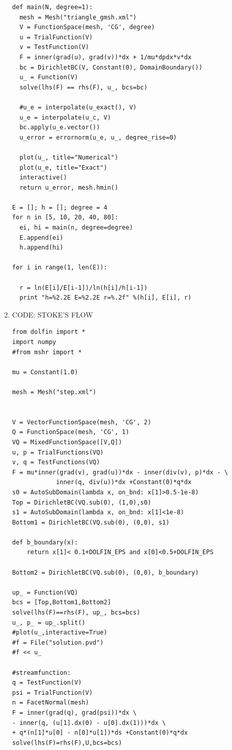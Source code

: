 \documentclass{article}
\begin{document}
\begin{enumerate}
\begin{verbatim}
def main(N, degree=1):
  mesh = Mesh("triangle_gmsh.xml")
  V = FunctionSpace(mesh, 'CG', degree)
  u = TrialFunction(V)
  v = TestFunction(V)
  F = inner(grad(u), grad(v))*dx + 1/mu*dpdx*v*dx
  bc = DirichletBC(V, Constant(0), DomainBoundary())
  u_ = Function(V)
  solve(lhs(F) == rhs(F), u_, bcs=bc)

  #u_e = interpolate(u_exact(), V)
  u_e = interpolate(u_c, V)
  bc.apply(u_e.vector())
  u_error = errornorm(u_e, u_, degree_rise=0)

  plot(u_, title="Numerical")
  plot(u_e, title="Exact")
  interactive()
  return u_error, mesh.hmin()

E = []; h = []; degree = 4
for n in [5, 10, 20, 40, 80]:
  ei, hi = main(n, degree=degree)
  E.append(ei)
  h.append(hi)

for i in range(1, len(E)):

  r = ln(E[i]/E[i-1])/ln(h[i]/h[i-1])
  print "h=%2.2E E=%2.2E r=%.2f" %(h[i], E[i], r)
\end{verbatim}

\newpage


\item{CODE: STOKE'S FLOW}
\begin{verbatim}
from dolfin import *
import numpy
#from mshr import *

mu = Constant(1.0)

mesh = Mesh("step.xml")


V = VectorFunctionSpace(mesh, 'CG', 2)
Q = FunctionSpace(mesh, 'CG', 1)
VQ = MixedFunctionSpace([V,Q])
u, p = TrialFunctions(VQ)
v, q = TestFunctions(VQ)
F = mu*inner(grad(v), grad(u))*dx - inner(div(v), p)*dx - \
			inner(q, div(u))*dx +Constant(0)*q*dx
s0 = AutoSubDomain(lambda x, on_bnd: x[1]>0.5-1e-8)
Top = DirichletBC(VQ.sub(0), (1,0),s0)
s1 = AutoSubDomain(lambda x, on_bnd: x[1]<1e-8)
Bottom1 = DirichletBC(VQ.sub(0), (0,0), s1)

def b_boundary(x):
	return x[1]< 0.1+DOLFIN_EPS and x[0]<0.5+DOLFIN_EPS

Bottom2 = DirichletBC(VQ.sub(0), (0,0), b_boundary)

up_ = Function(VQ)
bcs = [Top,Bottom1,Bottom2]
solve(lhs(F)==rhs(F), up_, bcs=bcs)
u_, p_ = up_.split()
#plot(u_,interactive=True)
#f = File("solution.pvd")
#f << u_

#streamfunction:
q = TestFunction(V)
psi = TrialFunction(V)
n = FacetNormal(mesh)
F = inner(grad(q), grad(psi))*dx \
- inner(q, (u[1].dx(0) - u[0].dx(1)))*dx \
+ q*(n[1]*u[0] - n[0]*u[1])*ds +Constant(0)*q*dx
solve(lhs(F)=rhs(F),U,bcs=bcs)

\end{verbatim}

\end{enumerate}
\end{document}
